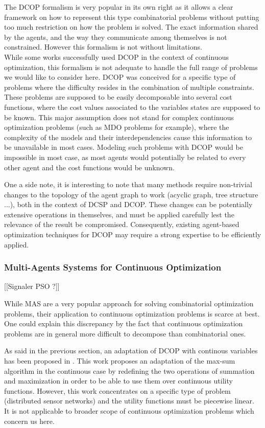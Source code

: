 The DCOP formalism is very popular in its own right as it allows a clear framework on how to represent this type combinatorial problems without putting too much restriction on how the problem  is solved. The exact information shared by the agents, and the way they communicate among themselves is not constrained. However this formalism is not without limitations.\\
While some works successfully used DCOP in the context of continuous optimization\cite{stranders2009decentralised}, this formalism is not adequate to handle the full range of problems we would like to consider here. DCOP was conceived for a specific type of problems where the difficulty resides in the combination of multiple constraints. These problems are supposed to be easily decomposable into several cost functions, where the cost values associated to the variables states are supposed to be known. This major assumption does not stand for complex continuous optimization problems (such as MDO problems for example), where the complexity of the models and their interdependencies cause this information to be unavailable in most cases. Modeling such problems with DCOP would be impossible in most case, as most agents would potentially be related to every other agent and the cost functions would be unknown.

One a side note, it is interesting to note that many methods require non-trivial changes to the topology of the agent graph to work (acyclic graph, tree structure ...), both in the context of DCSP and DCOP. These changes can  be potentially extensive operations in themselves, and must be applied carefully lest the relevance of the result be compromised. Consequently, existing agent-based optimization techniques for DCOP may require a strong expertise to be efficiently applied\cite{Ka2011.6}.

\subsubsection{Multi-Agents Systems for Continuous Optimization}

[[Signaler PSO ?]]

While MAS are a very popular approach for solving combinatorial optimization problems, their application to continuous optimization problems is scarce at best. One could explain this discrepancy by the fact that continuous optimization problems are in general more difficult to decompose than combinatorial ones.

As said in the previous section, an adaptation of DCOP with continous variables has been proposed in \cite{stranders2009decentralised}. This work proposes an adaptation of the max-sum algorithm in the continuous case by redefining the two operations of summation and maximization in order to be able to use them over continuous utility functions.
However, this work concentrates on a specific type of problem (distributed sensor networks) and the utility functions must be piecewise linear. It is not applicable to broader scope of continuous optimization problems which concern us here.

